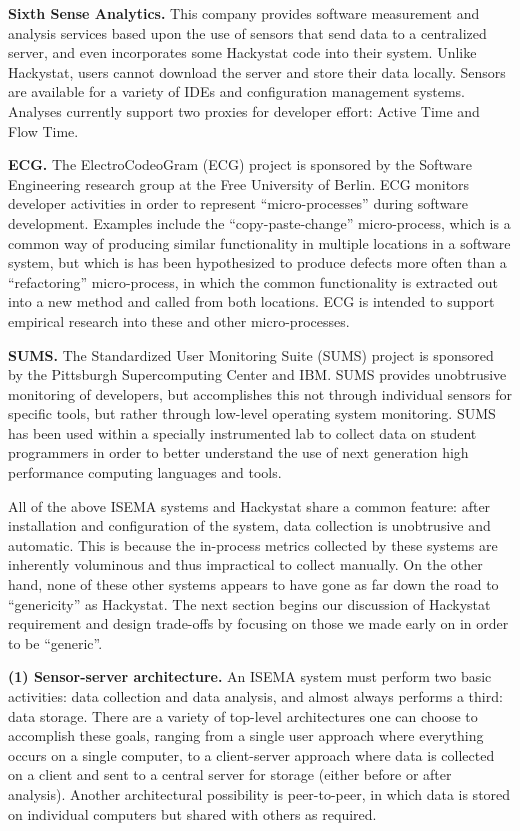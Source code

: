 \documentclass[10pt,twocolumn]{article}
\begin{document}
{\bf Sixth Sense Analytics.} This company \cite{SixthSenseAnalytics}
provides software measurement and analysis services based upon the use of
sensors that send data to a centralized server, and even incorporates some
Hackystat code into their system.  Unlike Hackystat, users cannot download
the server and store their data locally. Sensors are available for a
variety of IDEs and configuration management systems.  Analyses currently
support two proxies for developer effort: Active Time and Flow Time.

{\bf ECG.}  The ElectroCodeoGram (ECG) project \cite{ECG} is sponsored by
the Software Engineering research group at the Free University of
Berlin. ECG monitors developer activities in
order to represent ``micro-processes'' during software development.
Examples include the ``copy-paste-change'' micro-process, which is a common
way of producing similar functionality in multiple locations in a software
system, but which is has been hypothesized to produce defects more often
than a ``refactoring'' micro-process, in which the common functionality is
extracted out into a new method and called from both locations.  ECG is
intended to support empirical research into these and other micro-processes.

 {\bf SUMS.} The Standardized User Monitoring Suite (SUMS) project
\cite{SUMS} is sponsored by the Pittsburgh Supercomputing Center and IBM.
SUMS provides unobtrusive monitoring of developers, but accomplishes this
not through individual sensors for specific tools, but rather through
low-level operating system monitoring.  SUMS has been used within a
specially instrumented lab to collect data on student programmers in order
to better understand the use of next generation high performance computing
languages and tools.

All of the above ISEMA systems and Hackystat share a common feature: after
installation and configuration of the system, data collection is
unobtrusive and automatic. This is because the in-process metrics collected
by these systems are inherently voluminous and thus impractical to collect
manually.  On the other hand, none of these other systems appears to have
gone as far down the road to ``genericity'' as Hackystat.  The next section
begins our discussion of Hackystat requirement and design trade-offs by
focusing on those we made early on in order to be ``generic''.


{\bf (1) Sensor-server architecture.} An ISEMA system must perform two basic
activities: data collection and data analysis, and almost always performs
a third: data storage.  There are a variety of top-level architectures one
can choose to accomplish these goals, ranging from a single user approach where
everything occurs on a single computer, to a client-server approach where data
is collected on a client and sent to a central server for storage (either before
or after analysis).  Another architectural possibility is peer-to-peer, in which 
data is stored on individual computers but shared with others as required. 
\end{document}
